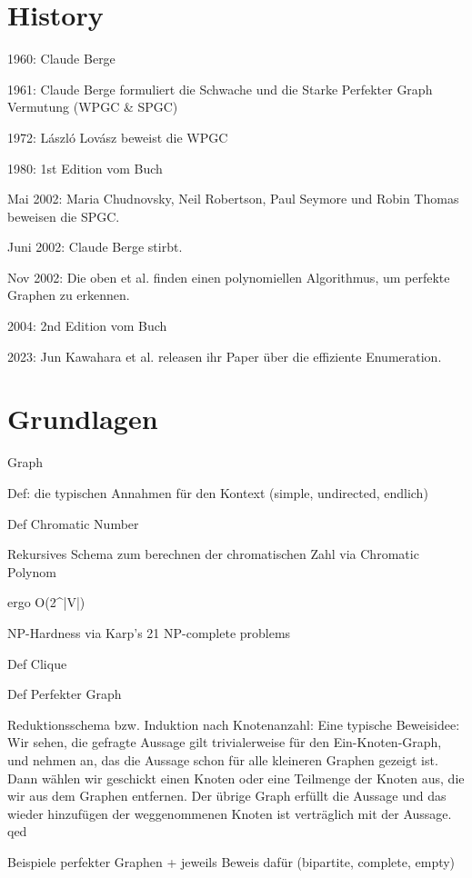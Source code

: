 \documentclass[../main.tex]{subfiles}
\begin{document}
\chapter{History}

1960: Claude Berge

1961: Claude Berge formuliert die Schwache und die Starke Perfekter Graph Vermutung (WPGC & SPGC)

1972: László Lovász beweist die WPGC

1980: 1st Edition vom Buch

Mai 2002: Maria Chudnovsky, Neil Robertson, Paul Seymore und Robin Thomas beweisen die SPGC.

Juni 2002: Claude Berge stirbt.

Nov 2002: Die oben et al. finden einen polynomiellen Algorithmus, um perfekte Graphen zu erkennen.

2004: 2nd Edition vom Buch

2023: Jun Kawahara et al. releasen ihr Paper über die effiziente Enumeration.

\chapter{Grundlagen}
\label{chapter:basics}

\begin{definition}
    Graph
\end{definition}

Def: die typischen Annahmen für den Kontext (simple, undirected, endlich)

Def Chromatic Number

Rekursives Schema zum berechnen der chromatischen Zahl via Chromatic Polynom

ergo O(2^|V|)

NP-Hardness via Karp's 21 NP-complete problems

Def Clique

Def Perfekter Graph

Reduktionsschema bzw. Induktion nach Knotenanzahl:
    Eine typische Beweisidee: Wir sehen, die gefragte Aussage gilt trivialerweise für den Ein-Knoten-Graph, und nehmen an, das die Aussage schon für alle kleineren Graphen gezeigt ist. Dann wählen wir geschickt einen Knoten oder eine Teilmenge der Knoten aus, die wir aus dem Graphen entfernen. Der übrige Graph erfüllt die Aussage und das wieder hinzufügen der weggenommenen Knoten ist verträglich mit der Aussage. qed

Beispiele perfekter Graphen + jeweils Beweis dafür
    (bipartite, complete, empty)
\end{document}
